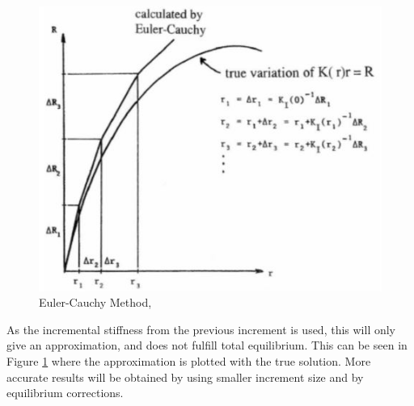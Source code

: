 \begin{figure}[H]
\centering
\includegraphics[scale=1]{figures/euler}
\caption[$\; \:$Euler-Cauchy Method]{Euler-Cauchy Method, \cite{moan2003} }
 \label{fig:euler}
\end{figure}
\noindent As the incremental stiffness from the previous increment is used, this will only give an approximation, and does not fulfill total equilibrium. This can be seen in Figure \ref{fig:euler} where the approximation is plotted with the true solution. More accurate results will be obtained by using smaller increment size and by equilibrium corrections. 
